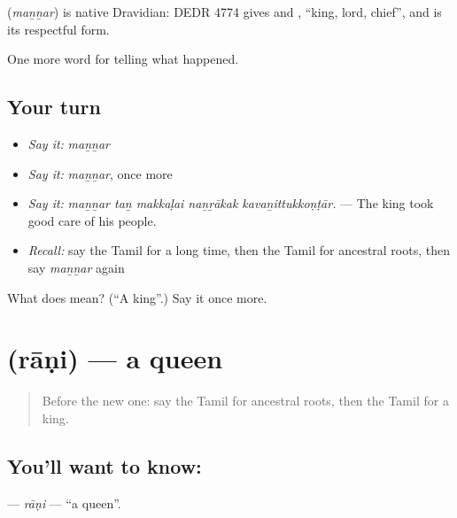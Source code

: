 \begin{cousinweb}
\textbf{} (\emph{maṉṉar}) is native Dravidian: DEDR 4774 gives  and , \textquotedblleft{}king, lord, chief\textquotedblright{}, and  is its respectful form.
\end{cousinweb}

\begin{grammarlens}[title={What you've built}]
One more word for telling what happened.
\end{grammarlens}

\subsection*{Your turn}
\begin{itemize}
\raggedright
  \item \emph{Say it:} \emph{maṉṉar}
  \item \emph{Say it:} \emph{maṉṉar}, once more
  \item \emph{Say it:} \emph{maṉṉar taṉ makkaḷai naṉṟākak kavaṉittukkoṇṭār.} — The king took good care of his people.
  \item \emph{Recall:} say the Tamil for a long time, then the Tamil for ancestral roots, then say \emph{maṉṉar} again
\end{itemize}

\begin{tcolorbox}[breakable,colback=teal!4,colframe=teal!35!black,title={Before you move on}]
What does  mean? (\textquotedblleft{}A king\textquotedblright{}.) Say it once more.
\end{tcolorbox}
\section[\texorpdfstring{\ta{ராணி} (rāṇi)}{ராணி (rāṇi)}]{ (rāṇi) — a queen}

\label{lesson:TA-C328-rani}



\begin{quote}
Before the new one: say the Tamil for ancestral roots, then the Tamil for a king.
\end{quote}

\subsection*{You'll want to know: }
\textbf{} — \emph{rāṇi} — \textquotedblleft{}a queen\textquotedblright{}.

